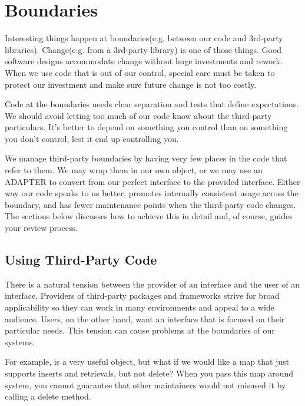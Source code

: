 
\chapter{Boundaries}

Interesting things happen at boundaries(e.g. between our code and 3rd-party libraries). Change(e.g. from a 3rd-party library) is one of those things. Good software designs accommodate change without huge investments and rework. When we use code that is out of our control, special care must be taken to protect our investment and make sure future change is not too costly.

Code at the boundaries needs clear separation and tests that define expectations. We
should avoid letting too much of our code know about the third-party particulars. It's better to depend on something you control than on something you don't control, lest it end up controlling you.

We manage third-party boundaries by having very few places in the code that refer to
them. We may wrap them in our own object, or we may use an ADAPTER to convert from
our perfect interface to the provided interface. Either way our code speaks to us better, promotes internally consistent usage across the boundary, and has fewer maintenance points when the third-party code changes. The sections below discusses how to achieve this in detail and, of course, guides your review process.

\section{Using Third-Party Code}

There is a natural tension between the provider of an interface and the user of an interface. Providers of third-party packages and frameworks strive for broad applicability so they can work in many environments and appeal to a wide audience. Users, on the other hand, want an interface that is focused on their particular needs. This tension can cause problems at the boundaries of our systems.

For example,  is a very useful object, but what if we would like a map that just supports inserts and retrievals, but not delete? When you pass this map around system, you cannot guarantee that other maintainers would not misused it by calling a delete method.

